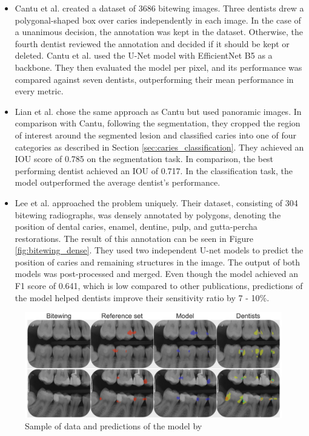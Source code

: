 \begin{itemize}
    \item{Cantu et al. \cite{Cantu2020}} created a dataset of 3686 bitewing images. Three dentists drew a polygonal-shaped box over caries independently in each image. In the case of a unanimous decision, the annotation was kept in the dataset. Otherwise, the fourth dentist reviewed the annotation and decided if it should be kept or deleted. Cantu et al. used the U-Net model with EfficientNet B5 as a backbone. They then evaluated the model per pixel, and its performance was compared against seven dentists, outperforming their mean performance in every metric.
    \item{Lian et al. \cite{Lian2021}} chose the same approach as Cantu but used panoramic images. In comparison with Cantu, following the segmentation, they cropped the region of interest around the segmented lesion and classified caries into one of four categories as described in Section \ref{sec:caries_classification}. They achieved an IOU score of 0.785 on the segmentation task. In comparison, the best performing dentist achieved an IOU of 0.717. In the classification task, the model outperformed the average dentist's performance.
    \item {Lee et al. \cite{Lee2021}}  approached the problem uniquely. Their dataset, consisting of 304 bitewing radiographs, was densely annotated by polygons, denoting the position of dental caries, enamel, dentine, pulp, and gutta-percha restorations. The result of this annotation can be seen in Figure \ref{fig:bitewing_dense}. They used two independent U-net models to predict the position of caries and remaining structures in the image. The output of both models was post-processed and merged. Even though the model achieved an F1 score of 0.641, which is low compared to other publications, predictions of the model helped dentists improve their sensitivity ratio by 7 - 10\%.
\end{itemize}

\begin{figure}
    \centering
    \includegraphics[width=\linewidth]{images/segmentatic_literature.png}
    \caption{Sample of data and predictions of the model by }
    \label{fig:segmentation_lit}
\end{figure}

